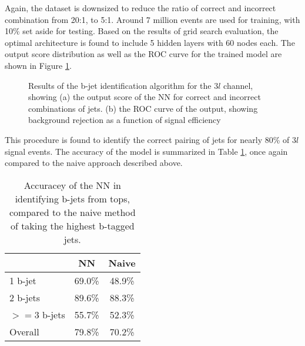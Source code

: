 Again, the dataset is downsized to reduce the ratio of correct and incorrect combination from 20:1, to 5:1. Around 7 million events are used for training, with 10\% set aside for testing. Based on the results of grid search evaluation, the optimal architecture is found to include 5 hidden layers with 60 nodes each. The output score distribution as well as the ROC curve for the trained model are shown in Figure \ref{fig:top3lresults}.

\begin{figure}[H]                                                                                                           
    \centering
   \label{fig:top3lresults}                                                                                               
   \caption{Results of the b-jet identification algorithm for the $3l$  channel, showing (a) the output score of the NN for correct and incorrect combinations of jets. (b) the ROC curve of the output, showing background rejection as a function of signal efficiency}
\end{figure}

This procedure is found to identify the correct pairing of jets for nearly 80\% of $3l$  signal events. The accuracy of the model is summarized in Table \ref{tab:topMatchAcc3l}, once again compared to the naive approach described above.

\begin{table}[H]
\centering
\caption{Accuracey of the NN in identifying b-jets from tops, compared to the naive method of taking the highest b-tagged jets.}
\begin{tabular}{|l|c|c|}
\hline\hline
& NN & Naive \\
\hline
1 b-jet    & 69.0\% & 48.9\% \\
2 b-jets   & 89.6\% & 88.3\% \\
$>=$3 b-jets & 55.7\% & 52.3\% \\
\hline
Overall & 79.8\% & 70.2\% \\
\hline\hline
\end{tabular}
\label{tab:topMatchAcc3l}
\end{table}


